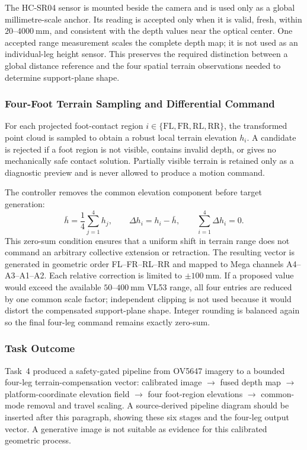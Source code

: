 \documentclass{engr1000j-s2}
\begin{document}
The HC-SR04 sensor is mounted beside the camera and is used only as a global millimetre-scale anchor. Its reading is accepted only when it is valid, fresh, within $20$--$4000~\mathrm{mm}$, and consistent with the depth values near the optical center. One accepted range measurement scales the complete depth map; it is not used as an individual-leg height sensor. This preserves the required distinction between a global distance reference and the four spatial terrain observations needed to determine support-plane shape.

\subsubsection{Four-Foot Terrain Sampling and Differential Command}

For each projected foot-contact region $i\in\{\mathrm{FL},\mathrm{FR},\mathrm{RL},\mathrm{RR}\}$, the transformed point cloud is sampled to obtain a robust local terrain elevation $h_i$. A candidate is rejected if a foot region is not visible, contains invalid depth, or gives no mechanically safe contact solution. Partially visible terrain is retained only as a diagnostic preview and is never allowed to produce a motion command.

The controller removes the common elevation component before target generation:
\[
\bar h=\frac{1}{4}\sum_{j=1}^{4}h_j,
\qquad
\Delta h_i=h_i-\bar h,
\qquad
\sum_{i=1}^{4}\Delta h_i=0.
\]
This zero-sum condition ensures that a uniform shift in terrain range does not command an arbitrary collective extension or retraction. The resulting vector is generated in geometric order FL--FR--RL--RR and mapped to Mega channels A4--A3--A1--A2. Each relative correction is limited to $\pm100~\mathrm{mm}$. If a proposed value would exceed the available $50$--$400~\mathrm{mm}$ VL53 range, all four entries are reduced by one common scale factor; independent clipping is not used because it would distort the compensated support-plane shape. Integer rounding is balanced again so the final four-leg command remains exactly zero-sum.

\subsubsection{Task Outcome}

Task~4 produced a safety-gated pipeline from OV5647 imagery to a bounded four-leg terrain-compensation vector: calibrated image $\rightarrow$ fused depth map $\rightarrow$ platform-coordinate elevation field $\rightarrow$ four foot-region elevations $\rightarrow$ common-mode removal and travel scaling. A source-derived pipeline diagram should be inserted after this paragraph, showing these six stages and the four-leg output vector. A generative image is not suitable as evidence for this calibrated geometric process.
\end{document}
